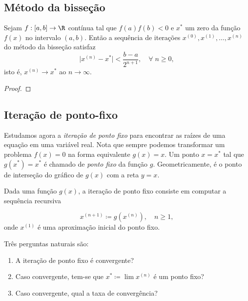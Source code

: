 \documentclass{article}
\begin{document}
\subsection{Método da bisseção}

\begin{thm} 
    Sejam \(f: [a,b] \to \R\) contínua tal que \(f(a)f(b)<0\) e \(x^{*}\) um zero da função \(f(x)\) no intervalo \((a,b)\). Então a sequência de iterações \(x^{(0)}, x^{(1)}, \ldots, x^{(n)}\) do método da bisseção satisfaz
    \begin{equation}
        \vert x^{(n)} - x^{*} \vert < \frac{b-a}{2^{n+1}}, \quad \forall \; n \geq 0,
    \end{equation}
    isto é, \(x^{(n)} \to x^{*}\) ao \(n \to \infty\).
\end{thm}

\begin{proof}
    
\end{proof}

\subsection{Iteração de ponto-fixo}

Estudamos agora a \emph{iteração de ponto fixo} para encontrar as raízes de uma equação em uma variável real. Nota que sempre podemos transformar um problema \(f(x)=0\) na forma equivalente \(g(x)=x\). Um ponto \(x=x^{*}\) tal que \(g(x^{*})=x^{*}\) é chamado de \emph{ponto fixo} da função \(g\). Geometricamente, é o ponto de interseção do gráfico de \(g(x)\) com a reta \(y=x\).

Dada uma função \(g(x)\), a iteração de ponto fixo consiste em computar a sequência recursiva

\begin{equation}
    x^{(n+1)} \coloneq g(x^{(n)}), \quad n \geq 1,
\end{equation}
onde \(x^{(1)}\) é uma aproximação inicial do ponto fixo.

Três perguntas naturais são:

\begin{enumerate}
    \item A iteração de ponto fixo é convergente?
    \item Caso convergente, tem-se que \(x^{*} \coloneq \lim x^{(n)}\) é um ponto fixo?
    \item Caso convergente, qual a taxa de convergência?
\end{enumerate}
\end{document}
